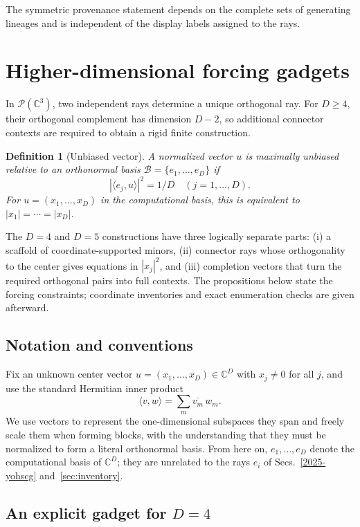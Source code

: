\documentclass[%
  reprint,
  superscriptaddress,
  showkeys,
  amsmath,amssymb,
  aps,pra,
  longbibliography,
  floatfix,
  x11names
]{revtex4-2}
\newtheorem{definition}{Definition}
\begin{document}
The symmetric provenance statement depends on the complete sets of generating lineages and is independent of the display labels assigned to the rays.






\section{Higher-dimensional forcing gadgets}
\label{2025-hdfg}

In $\mathcal{P}(\mathbb{C}^3)$, two independent rays determine a unique orthogonal ray.  For $D\geq4$, their orthogonal complement has dimension $D-2$, so additional connector contexts are required to obtain a rigid finite construction.

\begin{definition}[Unbiased vector]
\label{def:unbiased}
A normalized vector $u$ is maximally unbiased relative to an orthonormal basis $\mathcal{B}=\{e_1,\ldots,e_D\}$ if
\[
|\langle e_j,u\rangle|^2=1/D\quad (j=1,\ldots,D).
\]
For $u=(x_1,\ldots,x_D)$ in the computational basis, this is equivalent to \ensuremath{|x_1|=\cdots=|x_D|}.
\end{definition}

The $D=4$ and $D=5$ constructions have three logically separate parts: (i) a scaffold of coordinate-supported minors, (ii) connector rays whose orthogonality to the center gives equations in $|x_j|^2$, and (iii) completion vectors that turn the required orthogonal pairs into full contexts.  The propositions below state the forcing constraints; coordinate inventories and exact enumeration checks are given afterward.

\subsection{Notation and conventions}
Fix an unknown center vector $u = (x_1,\dots,x_D) \in \mathbb{C}^D$ with $x_j \ne 0$ for all $j$, and use the standard Hermitian inner product
\[
\langle v,w\rangle = \sum_m \overline{v_m}\, w_m.
\]
We use vectors to represent the one-dimensional subspaces they span and freely scale them when forming blocks,
with the understanding that they must be normalized to form a literal orthonormal basis.
From here on, $e_1,\ldots,e_D$ denote the computational basis of $\mathbb{C}^D$; they are unrelated to the rays $e_i$ of Secs.~\ref{2025-yohscg} and~\ref{sec:inventory}.

\subsection{An explicit gadget for \texorpdfstring{$D=4$}{D=4}}
\end{document}
